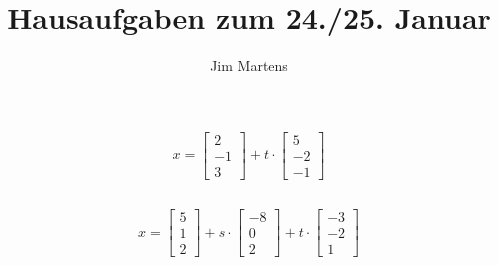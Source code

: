 \documentclass[10pt,a4paper,oneside,ngerman,numbers=noenddot]{scrartcl}
\begin{document}
\author{Jim Martens}
\title{Hausaufgaben zum 24./25. Januar}
\maketitle
\section{} %
\subsection{} %
\begin{equation*}
x = 
\begin{bmatrix} 
2 \\ 
-1 \\ 
3 
\end{bmatrix} + t \cdot
\begin{bmatrix}
5 \\
-2 \\
-1
\end{bmatrix}
\end{equation*}
\subsection{} %
\subsubsection{} %
\begin{equation*}
x =
\begin{bmatrix}
5 \\
1 \\
2
\end{bmatrix} + s \cdot
\begin{bmatrix}
-8 \\
0 \\
2
\end{bmatrix} + t \cdot
\begin{bmatrix}
-3 \\
-2 \\
1
\end{bmatrix}
\end{equation*}
\end{document}

